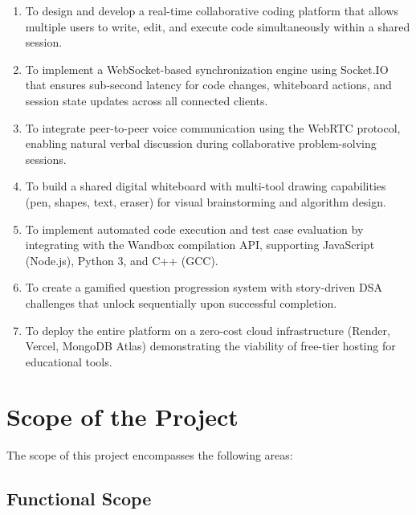 \documentclass[12pt,a4paper,oneside]{report}
\begin{document}
\begin{enumerate}[label=\arabic*.]
    \item To design and develop a real-time collaborative coding platform that allows multiple users to write, edit, and execute code simultaneously within a shared session.
    \item To implement a WebSocket-based synchronization engine using Socket.IO that ensures sub-second latency for code changes, whiteboard actions, and session state updates across all connected clients.
    \item To integrate peer-to-peer voice communication using the WebRTC protocol, enabling natural verbal discussion during collaborative problem-solving sessions.
    \item To build a shared digital whiteboard with multi-tool drawing capabilities (pen, shapes, text, eraser) for visual brainstorming and algorithm design.
    \item To implement automated code execution and test case evaluation by integrating with the Wandbox compilation API, supporting JavaScript (Node.js), Python 3, and C++ (GCC).
    \item To create a gamified question progression system with story-driven DSA challenges that unlock sequentially upon successful completion.
    \item To deploy the entire platform on a zero-cost cloud infrastructure (Render, Vercel, MongoDB Atlas) demonstrating the viability of free-tier hosting for educational tools.
\end{enumerate}

\section{Scope of the Project}

The scope of this project encompasses the following areas:

\subsection{Functional Scope}
\end{document}
